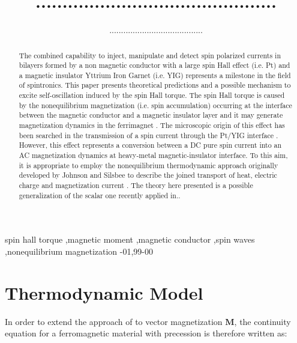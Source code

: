 \documentclass[review]{elsarticle}
\begin{document}
\begin{frontmatter}
\title{.............................................}

\author{........................................}
\address{Istituto Nazionale di Ricerca Metrologica (I.N.Ri.M.), Strada delle Cacce, 91, 10135 Torino, ITALY}

\begin{abstract}

The combined capability to inject, manipulate and detect spin polarized currents in bilayers formed by a non magnetic conductor with a large 
spin Hall effect (i.e. Pt) and a magnetic insulator Yttrium Iron Garnet (i.e. YIG) represents a milestone in the field of spintronics. This paper 
presents theoretical predictions and a possible mechanism to excite  self-oscillation induced by the spin Hall torque. The spin Hall torque is 
caused by the nonequilibrium magnetization (i.e. spin accumulation) occurring at the interface between the magnetic conductor and a 
magnetic insulator  layer and it may generate magnetization dynamics in the ferrimagnet \cite{collet2016generation}. The microscopic origin 
of this effect has been searched in the transmission of a spin current through the Pt/YIG interface \cite{tserkovnyak2002spin}. However,  
this effect represents a conversion between a DC pure spin current into an AC magnetization dynamics at heavy-metal magnetic-insulator 
interface. To this aim, it is appropriate to employ the nonequilibrium thermodynamic approach originally developed by Johnson and Silsbee 
to describe the joined transport of heat, electric charge and magnetization current \cite{johnson1987thermodynamic}. The theory here 
presented is a possible generalization of the scalar one recently applied in.\cite{basso2016nonequilibrium, basso2016thermodynamic}. 
\end{abstract}

\begin{keyword}
spin hall torque \sep magnetic moment \sep magnetic conductor \sep spin waves \sep nonequilibrium magnetization 
-01\sep  99-00
\end{keyword}
\end{frontmatter}
\linenumbers

\section{Thermodynamic Model}
In order to extend the approach of \cite{johnson1987thermodynamic, basso2016nonequilibrium, basso2016thermodynamic} to vector 
magnetization $\mathbf{M}$, the continuity equation for a ferromagnetic material with precession is therefore written as:
\end{document}
